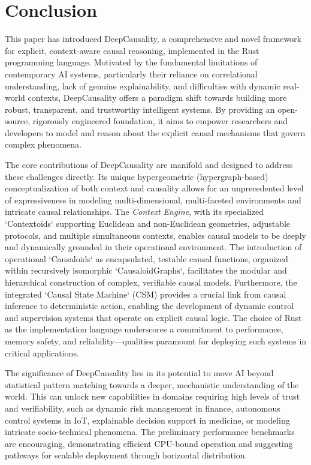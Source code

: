 \section{Conclusion}
\label{sec:conclusion}

This paper has introduced DeepCausality, a comprehensive and novel framework for explicit, context-aware causal reasoning, implemented in the Rust programming language. Motivated by the fundamental limitations of contemporary AI systems, particularly their reliance on correlational understanding, lack of genuine explainability, and difficulties with dynamic real-world contexts, DeepCausality offers a paradigm shift towards building more robust, transparent, and trustworthy intelligent systems. By providing an open-source, rigorously engineered foundation, it aims to empower researchers and developers to model and reason about the explicit causal mechanisms that govern complex phenomena.

The core contributions of DeepCausality are manifold and designed to address these challenges directly. Its unique hypergeometric (hypergraph-based) conceptualization of both context and causality allows for an unprecedented level of expressiveness in modeling multi-dimensional, multi-faceted environments and intricate causal relationships. The \textit{Context Engine}, with its specialized `Contextoids` supporting Euclidean and non-Euclidean geometries, adjustable protocols, and multiple simultaneous contexts, enables causal models to be deeply and dynamically grounded in their operational environment. The introduction of operational `Causaloids` as encapsulated, testable causal functions, organized within recursively isomorphic `CausaloidGraphs`, facilitates the modular and hierarchical construction of complex, verifiable causal models. Furthermore, the integrated `Causal State Machine` (CSM) provides a crucial link from causal inference to deterministic action, enabling the development of dynamic control and supervision systems that operate on explicit causal logic. The choice of Rust as the implementation language underscores a commitment to performance, memory safety, and reliability—qualities paramount for deploying such systems in critical applications.

The significance of DeepCausality lies in its potential to move AI beyond statistical pattern matching towards a deeper, mechanistic understanding of the world. This can unlock new capabilities in domains requiring high levels of trust and verifiability, such as dynamic risk management in finance, autonomous control systems in IoT, explainable decision support in medicine, or modeling intricate socio-technical phenomena. The preliminary performance benchmarks are encouraging, demonstrating efficient CPU-bound operation and suggesting pathways for scalable deployment through horizontal distribution.

